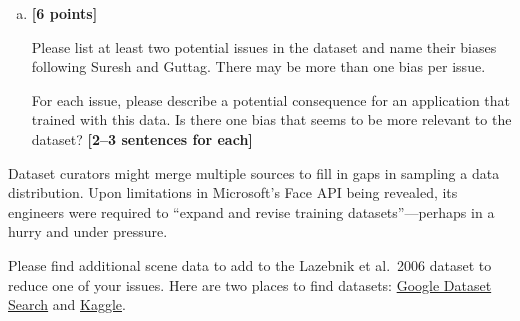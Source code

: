 \pagebreak
\begin{enumerate}[(a)]
    \item \textbf{[6 points]}
    \begin{tcolorbox}[colback=orange!5!white,colframe=orange!75!black]

    Please list at least two potential issues in the dataset and name their biases following Suresh and Guttag. There may be more than one bias per issue. 

    For each issue, please describe a potential consequence for an application that trained with this data. Is there one bias that seems to be more relevant to the dataset? \textbf{[2--3 sentences for each]}
    \end{tcolorbox}


\end{enumerate}

\pagebreak
Dataset curators might merge multiple sources to fill in gaps in sampling a data distribution. Upon limitations in Microsoft's Face API being revealed, its engineers were required to ``expand and revise training datasets''---perhaps in a hurry and under pressure. 

Please find additional scene data to add to the Lazebnik et al.~2006 dataset to reduce one of your issues. Here are two places to find datasets: \href{https://datasetsearch.research.google.com}{Google Dataset Search} and \href{https://www.kaggle.com}{Kaggle}. 

